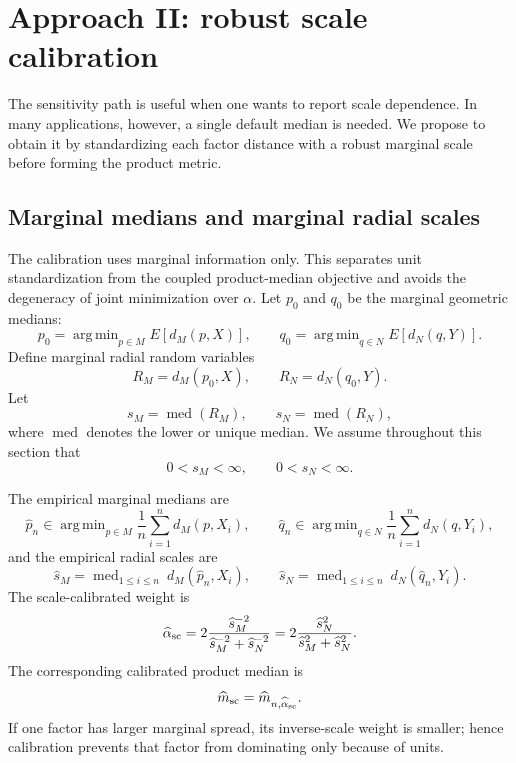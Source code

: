 \documentclass[11pt]{article}
\DeclareMathOperator*{\argmin}{arg\,min}
\newcommand{\1}{\mathbf{1}}
\begin{document}
\section{Approach II: robust scale calibration}\label{sec:scale-calibration}

The sensitivity path is useful when one wants to report scale dependence.  In
many applications, however, a single default median is needed.  We propose to
obtain it by standardizing each factor distance with a robust marginal scale
before forming the product metric.

\subsection{Marginal medians and marginal radial scales}

The calibration uses marginal information only.  This separates unit
standardization from the coupled product-median objective and avoids the
degeneracy of joint minimization over $\alpha$.  Let $p_0$ and $q_0$ be the
marginal geometric medians:
\begin{equation}\label{eq:marginal-medians}
 p_0=\argmin_{p\in M}E[d_M(p,X)],
 \qquad
 q_0=\argmin_{q\in N}E[d_N(q,Y)].
\end{equation}
Define marginal radial random variables
\[
 R_M=d_M(p_0,X),
 \qquad
 R_N=d_N(q_0,Y).
\]
Let
\begin{equation}\label{eq:pop-scales}
 s_M=\operatorname{med}(R_M),
 \qquad
 s_N=\operatorname{med}(R_N),
\end{equation}
where $\operatorname{med}$ denotes the lower or unique median.  We assume throughout this section that
\[
 0<s_M<\infty,
 \qquad
 0<s_N<\infty.
\]

The empirical marginal medians are
\begin{equation}\label{eq:emp-marginal-medians}
 \widehat p_n\in\argmin_{p\in M}\frac1n\sum_{i=1}^n d_M(p,X_i),
 \qquad
 \widehat q_n\in\argmin_{q\in N}\frac1n\sum_{i=1}^n d_N(q,Y_i),
\end{equation}
and the empirical radial scales are
\begin{equation}\label{eq:emp-scales}
 \widehat s_M=\operatorname{med}_{1\le i\le n}\ d_M(\widehat p_n,X_i),
 \qquad
 \widehat s_N=\operatorname{med}_{1\le i\le n}\ d_N(\widehat q_n,Y_i).
\end{equation}
The scale-calibrated weight is
\begin{equation}\label{eq:alpha-sc}
 \widehat\alpha_{\rm sc}
 =2\frac{\widehat s_M^{-2}}{\widehat s_M^{-2}+\widehat s_N^{-2}}
 =2\frac{\widehat s_N^2}{\widehat s_M^2+\widehat s_N^2}.
\end{equation}
The corresponding calibrated product median is
\begin{equation}\label{eq:calibrated-median}
 \widehat m_{\rm sc}=\widehat m_{n,\widehat\alpha_{\rm sc}}.
\end{equation}
If one factor has larger marginal spread, its inverse-scale weight is smaller;
hence calibration prevents that factor from dominating only because of units.
\end{document}
